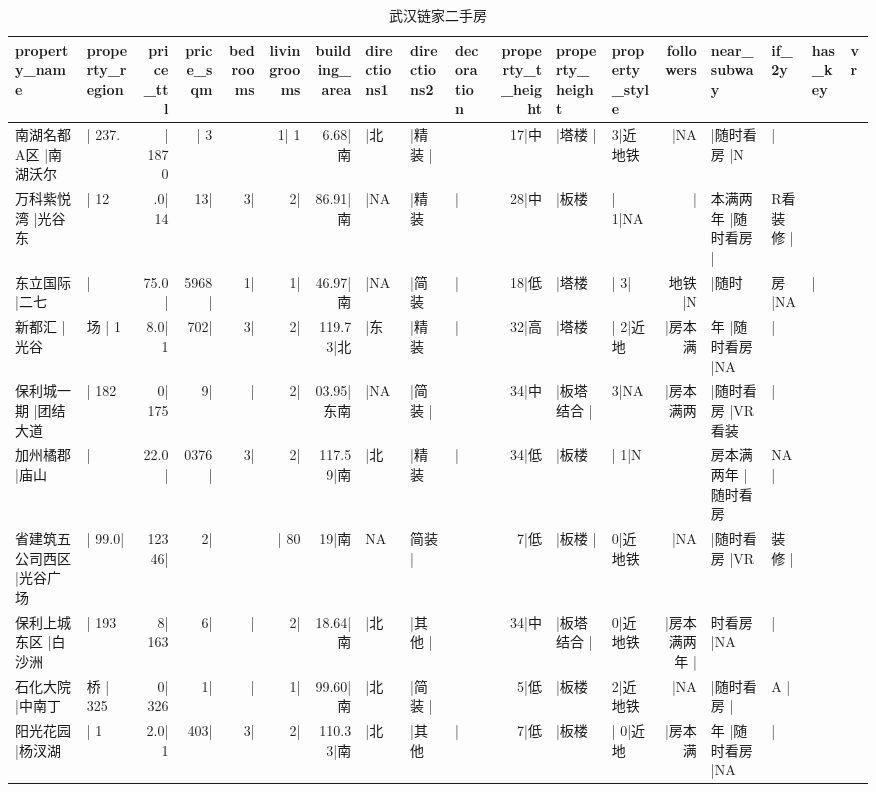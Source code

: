 \documentclass[
]{article}
\begin{document}
\begin{longtable}[t]{llrrrrrlllrllrllll}
\caption{\label{tab:unnamed-chunk-2}武汉链家二手房}\\
\toprule
property\_name & property\_region & price\_ttl & price\_sqm & bedrooms & livingrooms & building\_area & directions1 & directions2 & decoration & property\_t\_height & property\_height & property\_style & followers & near\_subway & if\_2y & has\_key & vr\\
\midrule
南湖名都A区      |南湖沃尔 & |     237. & |     1870 & |        3 &  & 1|        1 & 6.68|南 & |北 & |精装       | &  & 17|中 & |塔楼           | & 3|近地铁 & |NA & |随时看房 |N & | &  & \\
万科紫悦湾       |光谷东 & |     12 & .0|     14 & 13| & 3| & 2| & 86.91|南 & |NA & |精装 & | & 28|中 & |板楼 & |         1|NA & | & 本满两年 |随时看房 | & R看装修 | &  & \\
东立国际         |二七 & | & 75.0| & 5968| & 1| & 1| & 46.97|南 & |NA & |简装 & | & 18|低 & |塔楼 & |         3| & 地铁      |N & |随时 & 房 |NA & | & \\
新都汇           |光谷 & 场        |     1 & 8.0|     1 & 702| & 3| & 2| & 119.73|北 & |东 & |精装 & | & 32|高 & |塔楼 & |         2|近地 & |房本满 & 年 |随时看房 |NA & | &  & \\
保利城一期       |团结大道 & |     182 & 0|     175 & 9| & | & 2| & 03.95|东南 & |NA & |简装       | &  & 34|中 & |板塔结合       | & 3|NA & |房本满两 & |随时看房 |VR看装 & | &  & \\
\addlinespace
加州橘郡         |庙山 & | & 22.0| & 0376| & 3| & 2| & 117.59|南 & |北 & |精装 & | & 34|低 & |板楼 & |         1|N &  & 房本满两年 |随时看房 & NA       | &  & \\
省建筑五公司西区 |光谷广场 & |      99.0| & 12346| & 2| &  & |         80 & 19|南 & NA & 简装       | &  & 7|低 & |板楼           | & 0|近地铁 & |NA & |随时看房 |VR & 装修 | &  & \\
保利上城东区     |白沙洲 & |     193 & 8|     163 & 6| & | & 2| & 18.64|南 & |北 & |其他       | &  & 34|中 & |板塔结合       | & 0|近地铁 & |房本满两年 | & 时看房 |NA & | &  & \\
石化大院         |中南丁 & 桥      |     325 & 0|     326 & 1| & | & 1| & 99.60|南 & |北 & |简装       | &  & 5|低 & |板楼 & 2|近地铁 & |NA & |随时看房 | & A       | &  & \\
阳光花园         |杨汊湖 & |     1 & 2.0|     1 & 403| & 3| & 2| & 110.33|南 & |北 & |其他 & | & 7|低 & |板楼 & |         0|近地 & |房本满 & 年 |随时看房 |NA & | &  & \\
\bottomrule
\end{longtable}
\end{document}
